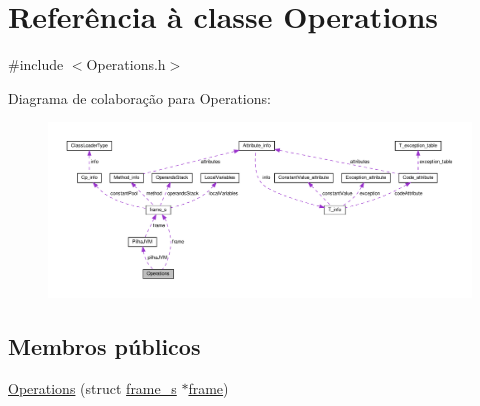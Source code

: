 \hypertarget{classOperations}{}\section{Referência à classe Operations}
\label{classOperations}


{\ttfamily \#include $<$Operations.\+h$>$}



Diagrama de colaboração para Operations\+:\nopagebreak
\begin{figure}[H]
\begin{center}
\leavevmode
\includegraphics[width=350pt]{classOperations__coll__graph}
\end{center}
\end{figure}
\subsection*{Membros públicos}
\begin{DoxyCompactItemize}
\item 
\hyperlink{classOperations_a302329a641fa78f54d1f1f307736b870}{Operations} (struct \hyperlink{structframe__s}{frame\+\_\+s} $\ast$\hyperlink{classOperations_a0dc7b3710786c9cbd14801ac3e5d34b2}{frame})
\end{DoxyCompactItemize}
